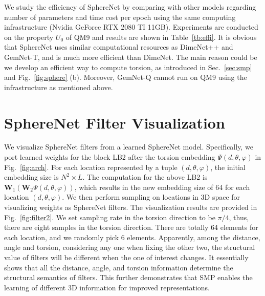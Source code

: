 \documentclass{article}
\begin{document}
We study the efficiency of SphereNet by comparing with other models regarding number of parameters
and time cost per epoch using the same computing 
infrastructure (Nvidia GeForce RTX 2080 TI 11GB).
Experiments are conducted on the property $U_0$ of QM9 and results are shown in Table~\ref{tb:effi}. It is obvious that 
SphereNet uses similar computational resources
as DimeNet++ and GemNet-T, and is much more efficient than DimeNet.
The main reason could be we develop an efficient way
to compute torsion, as introduced
in Sec.~\ref{sec:smp} and Fig.~\ref{fig:sphere} (b).
Moreover, GemNet-Q cannot run on QM9 using the infrastructure as mentioned above.

\newpage

\section{SphereNet Filter Visualization}  \label{sec:supp_E}
We visualize SphereNet filters from a learned SphereNet model.
Specifically, we port learned weights for the block LB2 after the torsion embedding
$\Psi(d, \theta, \varphi)$ in Fig.~\ref{fig:arch}.
For each location represented by a tuple $(d, \theta, \varphi)$, the initial embedding size is
$N^2\times L$.
The computation for the above LB2 is $\mathbf{W}_1\left(\mathbf{W}_2\Psi(d, \theta, \varphi)\right)$,
which results in the new embedding size of 64 for each location $(d, \theta, \varphi)$.
We then perform sampling on locations in 3D space for
visualizing weights as SphereNet filters.
The visualization results are provided in
Fig.~\ref{fig:filter2}. 
We set sampling rate in the torsion direction to be $\pi/4$,
thus, there are eight samples in the torsion direction.
There are totally 64 elements for each location, and we randomly pick 6
elements. Apparently, among the distance, angle and torsion, considering any one when fixing the other two, the structural value of filters will be different when the one of interest changes. It essentially shows that all the distance, angle, and torsion information determine the structural semantics of filters. This further demonstrates that SMP enables the learning of different 3D information for improved representations.
\end{document}
